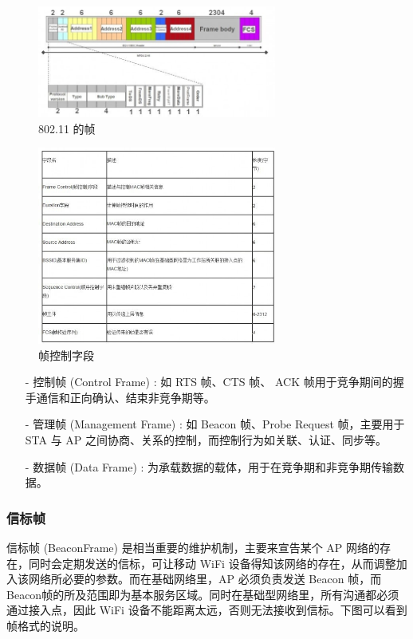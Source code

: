 \begin{figure}[htb]
\centering 
\includegraphics[width=0.70\textwidth]{img/ch1s5m1.jpg} 
\caption{802.11 的帧}
\label{Test}
\end{figure}

\begin{figure}[htb]
\centering 
\includegraphics[width=0.70\textwidth]{img/ch1s5m2.jpg} 
\caption{帧控制字段}
\label{Test}
\end{figure}

\begin{itemize}
\item [-] 控制帧 (Control Frame) : 如 RTS 帧、CTS 帧、 ACK 帧用于竞争期间的握手通信和正向确认、结束非竞争期等。
\item [-] 管理帧 (Management Frame) : 如 Beacon 帧、Probe Request 帧，主要用于 STA 与 AP 之间协商、关系的控制，而控制行为如关联、认证、同步等。
\item [-] 数据帧 (Data Frame) : 为承载数据的载体，用于在竞争期和非竞争期传输数据。
\end{itemize}

\subsubsection{信标帧}

信标帧 (BeaconFrame) 是相当重要的维护机制，主要来宣告某个 AP 网络的存在，同时会定期发送的信标，可让移动 WiFi 设备得知该网络的存在，从而调整加入该网络所必要的参数。而在基础网络里，AP 必须负责发送 Beacon 帧，而 Beacon帧的所及范围即为基本服务区域。同时在基础型网络里，所有沟通都必须通过接入点，因此 WiFi 设备不能距离太远，否则无法接收到信标。下图可以看到帧格式的说明。

